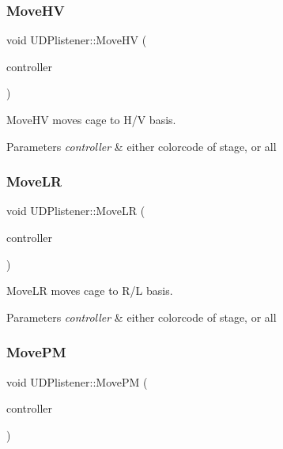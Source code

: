 \subsubsection{\texorpdfstring{Move\+HV}{MoveHV}}
{\footnotesize\ttfamily void U\+D\+Plistener\+::\+Move\+HV (\begin{DoxyParamCaption}\item[{Q\+String}]{controller }\end{DoxyParamCaption})\hspace{0.3cm}{\ttfamily [signal]}}



Move\+HV moves cage to H/V basis. 


\begin{DoxyParams}{Parameters}
{\em controller} & either colorcode of stage, or \textquotesingle{}all\textquotesingle{} \\
\hline
\end{DoxyParams}
\mbox{\label{classUDPlistener_aefb57eacf9148d294952db636eefa9ac}} 
\subsubsection{\texorpdfstring{Move\+LR}{MoveLR}}
{\footnotesize\ttfamily void U\+D\+Plistener\+::\+Move\+LR (\begin{DoxyParamCaption}\item[{Q\+String}]{controller }\end{DoxyParamCaption})\hspace{0.3cm}{\ttfamily [signal]}}



Move\+LR moves cage to R/L basis. 


\begin{DoxyParams}{Parameters}
{\em controller} & either colorcode of stage, or \textquotesingle{}all\textquotesingle{} \\
\hline
\end{DoxyParams}
\mbox{\label{classUDPlistener_a3e3521c57796737bb229eeadb2f2fdfe}} 
\subsubsection{\texorpdfstring{Move\+PM}{MovePM}}
{\footnotesize\ttfamily void U\+D\+Plistener\+::\+Move\+PM (\begin{DoxyParamCaption}\item[{Q\+String}]{controller }\end{DoxyParamCaption})\hspace{0.3cm}{\ttfamily [signal]}}



